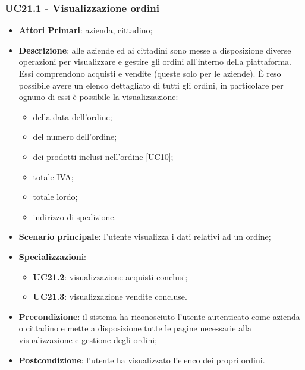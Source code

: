 \subsubsection{UC21.1 - Visualizzazione ordini}
\begin{itemize}
	\item \textbf{Attori Primari}: azienda, cittadino;
	\item \textbf{Descrizione}: alle aziende ed ai cittadini sono messe a disposizione diverse operazioni per visualizzare e gestire gli ordini all'interno della piattaforma. Essi comprendono acquisti e vendite (queste solo per le aziende). \`E reso possibile avere un elenco dettagliato di tutti gli ordini, in particolare per ognuno di essi è possibile la visualizzazione:
	\begin{itemize}
		\item della data dell'ordine;
		\item del numero dell'ordine;
		\item dei prodotti inclusi nell'ordine [UC10];
		\item totale IVA;
		\item totale lordo\glo;
		\item indirizzo di spedizione.
	\end{itemize}
	\item \textbf{Scenario principale}: l'utente visualizza i dati relativi ad un ordine;
	\item \textbf{Specializzazioni}:
	\begin{itemize}
		\item \textbf{UC21.2}: visualizzazione acquisti conclusi;
		\item \textbf{UC21.3}: visualizzazione vendite concluse.
	\end{itemize}
	\item \textbf{Precondizione}: il sistema ha riconosciuto l'utente autenticato come azienda o cittadino e mette a disposizione tutte le pagine necessarie alla visualizzazione e gestione degli ordini;
	\item \textbf{Postcondizione}: l'utente ha visualizzato l'elenco dei propri ordini.
\end{itemize} 



